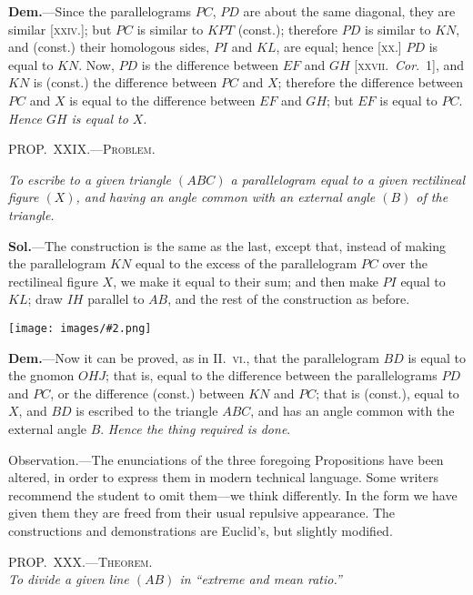 \documentclass[oneside]{book}
\newcommand\myprop[2]{
\bigskip\Needspace*{4\baselineskip}\begin{center}\textsc{#1}\\\medskip\emph{#2}\par\end{center}
}
\newcommand\mypropl[2]{
\bigskip\Needspace*{4\baselineskip}\begin{center}\textsc{#1}\end{center}
\hspace{\parindent}\emph{#2}\par\medskip
}
\newcommand\imgcent[2]{
\begin{center}
\texttt{[image: images/\#2.png]}
\end{center}
}
\begin{document}
\textbf{Dem.}---Since the parallelograms $PC$, $PD$ are about
the same diagonal, they are similar [\textsc{xxiv.}]; but $PC$ is
similar to $KPT$ (const.); therefore $PD$ is similar to $KN$,
and (const.) their homologous sides, $PI$ and $KL$, are
equal; hence [\textsc{xx.}] $PD$ is equal to $KN$. Now, $PD$ is
the difference between $EF$ and $GH$ [\textsc{xxvii.}\ \textit{Cor}.~1], and
$KN$ is (const.) the difference between $PC$ and $X$; therefore
the difference between $PC$ and $X$ is equal to the
difference between $EF$ and $GH$; but $EF$ is equal to $PC$.
\emph{Hence $GH$ is equal to $X$}.

\mypropl{PROP\@.~XXIX\@.---Problem.}{To escribe to a given triangle $(ABC)$ a parallelogram
equal to a given rectilineal figure $(X)$, and having an
angle common with an external angle $(B)$ of the triangle.}

\textbf{Sol.}---The construction is the same as the last,
except that, instead of making the parallelogram $KN$
equal to the excess of the parallelogram $PC$ over the
rectilineal figure $X$, we make it equal to their sum;
and then make $PI$ equal to $KL$; draw $IH$ parallel to
$AB$, and the rest of the construction as before.

\imgcent{280}{f209}

\textbf{Dem.}---Now it can be proved, as in II\@.~\textsc{vi}., that
the parallelogram $BD$ is equal to the gnomon $OHJ$;
that is, equal to the difference between the parallelograms
$PD$ and $PC$, or the difference (const.) between
$KN$ and $PC$; that is (const.), equal to $X$, and $BD$ is
escribed to the triangle $ABC$, and has an angle common
with the external angle $B$. \textit{Hence the thing required
is done}.

\smallskip
\begin{footnotesize}
\textsf{Observation.}---The enunciations of the three foregoing Propositions
have been altered, in order to express them in modern
technical language. Some writers recommend the student to
omit them---we think differently. In the form we have given
them they are freed from their usual repulsive appearance. The
constructions and demonstrations are Euclid's, but slightly modified.
\par\end{footnotesize}


\myprop{PROP\@.~XXX\@.---Theorem.}{To divide a given line $(AB)$ in ``extreme and mean ratio.''}
\end{document}

